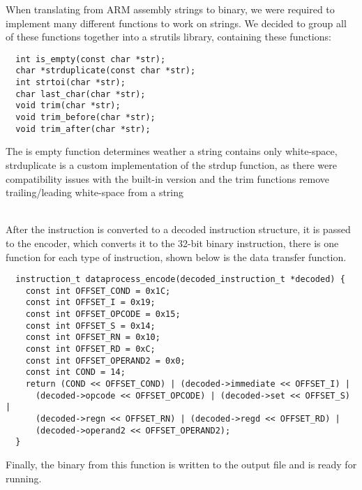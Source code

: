 When translating from ARM assembly strings to binary, we were required to implement many different functions to work on strings. We decided to group all of these functions together into a str\textunderscore{}utils library, containing these functions:

\begin{verbatim}
  int is_empty(const char *str);
  char *strduplicate(const char *str);
  int strtoi(char *str);
  char last_char(char *str);
  void trim(char *str);
  void trim_before(char *str);
  void trim_after(char *str);
\end{verbatim} 

The is empty function determines weather a string contains only white-space, strduplicate is a custom implementation of the strdup function, as there were compatibility issues with the built-in version and the trim functions remove trailing/leading white-space from a string

~\\

After the instruction is converted to a decoded instruction structure, it is passed to the encoder, which converts it to the 32-bit binary instruction, there is one function for each type of instruction, shown below is the data transfer function.

\begin{verbatim}
  instruction_t dataprocess_encode(decoded_instruction_t *decoded) {
    const int OFFSET_COND = 0x1C;
    const int OFFSET_I = 0x19;
    const int OFFSET_OPCODE = 0x15;
    const int OFFSET_S = 0x14;
    const int OFFSET_RN = 0x10;
    const int OFFSET_RD = 0xC;
    const int OFFSET_OPERAND2 = 0x0;
    const int COND = 14;
    return (COND << OFFSET_COND) | (decoded->immediate << OFFSET_I) |
      (decoded->opcode << OFFSET_OPCODE) | (decoded->set << OFFSET_S) |
      (decoded->regn << OFFSET_RN) | (decoded->regd << OFFSET_RD) |
      (decoded->operand2 << OFFSET_OPERAND2);
  }
\end{verbatim}

Finally, the binary from this function is written to the output file and is ready for running.